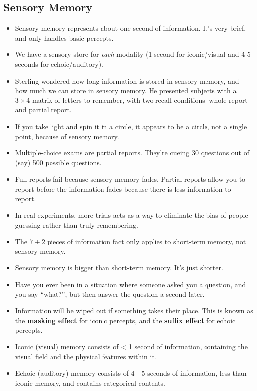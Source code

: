 \documentclass[]{article}
\begin{document}
		\subsection{Sensory Memory}
			\begin{itemize}
				\item Sensory memory represents about one second of information. It's very brief, and only handles basic percepts.
				\item We have a sensory store for \emph{each} modality (1 second for iconic/visual and 4-5 seconds for echoic/auditory).
				\item Sterling wondered how long information is stored in sensory memory, and how much we can store in sensory memory. He presented subjects with a $3 \times 4$ matrix of letters to remember, with two recall conditions: whole report and partial report.
				\item If you take light and spin it in a circle, it appears to be a circle, not a single point, because of sensory memory.
				\item Multiple-choice exams are partial reports. They're cueing 30 questions out of (say) 500 possible questions.
				\item Full reports fail because sensory memory fades. Partial reports allow you to report before the information fades because there is less information to report.
				\item In real experiments, more trials acts as a way to eliminate the bias of people guessing rather than truly remembering.
				\item The $7 \pm 2$ pieces of information fact only applies to short-term memory, not sensory memory.
				\item Sensory memory is bigger than short-term memory. It's just shorter.
				\item Have you ever been in a situation where someone asked you a question, and you say ``what?'', but then answer the question a second later.
				\item Information will be wiped out if something takes their place. This is known as the \textbf{masking effect} for iconic percepts, and the \textbf{suffix effect} for echoic percepts.
				\item Iconic (visual) memory consists of < 1 second of information, containing the visual field and the physical features within it.
				\item Echoic (auditory) memory consists of 4 - 5 seconds of information, less than iconic memory, and contains categorical contents.
			\end{itemize}
\end{document}

